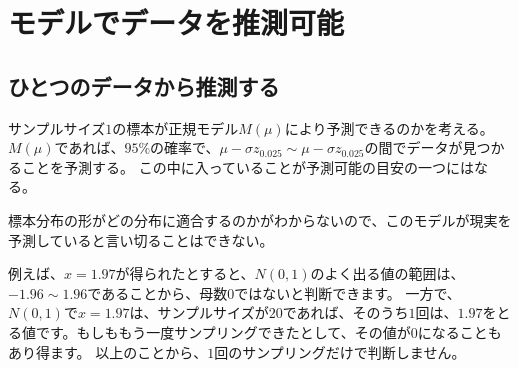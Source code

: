 \section{モデルでデータを推測可能}
\subsection{ひとつのデータから推測する}
サンプルサイズ$1$の標本が正規モデル$M(\mu)$により予測できるのかを考える。
$M(\mu)$であれば、$95\%$の確率で、$\mu-\sigma z_{0.025}\sim \mu-\sigma z_{0.025}$の間でデータが見つかることを予測する。
この中に入っていることが予測可能の目安の一つにはなる。

標本分布の形がどの分布に適合するのかがわからないので、このモデルが現実を予測していると言い切ることはできない。



例えば、$x=1.97$が得られたとすると、$N(0,1)$のよく出る値の範囲は、$-1.96\sim1.96$であることから、母数$0$ではないと判断できます。
一方で、$N(0,1)$で$x=1.97$は、サンプルサイズが$20$であれば、そのうち$1$回は、$1.97$をとる値です。もしももう一度サンプリングできたとして、その値が$0$になることもあり得ます。
以上のことから、$1$回のサンプリングだけで判断しません。
\fi


